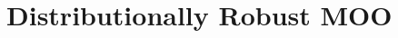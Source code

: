 \documentclass[twoside]{article} %
\def\eqref#1{equation~\ref{#1}}
\theoremstyle{plain}
\theoremstyle{definition}
\newtheorem{definition}[theorem]{Definition}
\theoremstyle{remark}
\begin{document}








\section{Distributionally Robust MOO}

\end{document}
